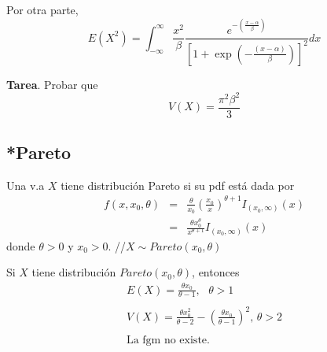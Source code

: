 \begin{i}
Por otra parte,
\begin{equation*}
E(X^{2})=\int_{-\infty }^{\infty }\frac{x^{2}}{\beta }\frac{e^{-\left( \frac{
x-\alpha }{\beta }\right) }}{\left[ 1+\exp \left( -\frac{(x-\alpha )}{\beta }
\right) \right] ^{2}}dx
\end{equation*}

\textbf{Tarea}. Probar que 
\begin{equation*}
V(X)=\frac{\pi ^{2}\beta ^{2}}{3}
\end{equation*}

\subsection{*Pareto}

\begin{definition}
Una v.a $X$ tiene distribución Pareto si su pdf está dada por
\begin{eqnarray*}
f(x,x_{0},\theta ) &=&\frac{\theta }{x_{0}}\left( \frac{x_{0}}{x}\right)
^{\theta +1}I_{(x_{0},\infty )}(x) \\
&=&\frac{\theta x_{0}^{\theta }}{x^{\theta +1}}I_{(x_{0},\infty )}(x)
\end{eqnarray*}%
donde $\theta >0$ y $x_{0}>0$. //$X\sim Pareto(x_{0},\theta )$
\end{definition}

\begin{theorem}
Si $X$ tiene distribución $Pareto(x_{0},\theta )$, entonces
\begin{equation*}
\begin{array}{l}
E(X)=\frac{\theta x_{0}}{\theta -1},\text{ \ }\theta >1 \\ 
\\ 
V(X)=\frac{\theta x_{0}^{2}}{\theta -2}-\left( \frac{\theta x_{0}}{\theta -1}
\right) ^{2}\text{, }\theta >2 \\ 
\\ 
\text{La fgm no existe.}
\end{array}
\end{equation*}
\end{theorem}


\end{i}
